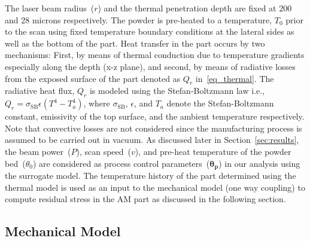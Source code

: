 The laser beam radius~($r$) and the thermal penetration depth are fixed at 200 and 28
microns respectively. The powder is pre-heated to a temperature, $T_0$ prior to the scan using fixed temperature
boundary conditions at the lateral sides as well as the bottom of the part. Heat transfer in the part occurs by two
mechanisms: First, by means of thermal conduction due to temperature gradients especially along the depth (x-z plane),
and second, by means of radiative losses from the exposed surface of the part denoted as $Q_r$ in~\eqref{eq_thermal}.
The radiative heat flux, $Q_r$ is modeled using the Stefan-Boltzmann law i.e., 
$Q_r=\sigma_\text{SB}\epsilon(T^4-T_a^4)$, where
$\sigma_\text{SB}$, $\epsilon$, and $T_a$ denote the Stefan-Boltzmann constant, emissivity of the top surface, and the ambient
temperature respectively. Note that convective losses are not considered since the manufacturing process is 
assumed to be
carried out in vacuum. As discussed later in Section~\ref{sec:results}, the beam power~($P$), scan speed~($v$), and 
pre-heat temperature of the powder bed~($\theta_0$) are considered as process control parameters~($\bm{\theta_p}$)
in our analysis using the surrogate model. The temperature history of the part determined using the thermal model
is used as an input to the mechanical model (one way coupling) to compute residual stress in the AM part as 
discussed in the following section. 

\subsection{Mechanical Model}
\label{sub:mech}

